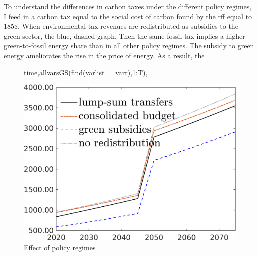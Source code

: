 To understand the differences in carbon taxes under the different policy regimes, I feed in a carbon tax equal to the social cost of carbon found by the rff equal to 185\$. When environmental tax revenues are redistributed as subsidies to the green sector, the blue, dashed graph. Then the same fossil tax implies a higher green-to-fossil energy share than in all other policy regimes. The subsidy to green energy ameliorates the rise in the price of energy. As a result, the 


\begin{figure}[h!!]time,allvarsGS(find(varlist==varr),1:T),
	\centering
	\caption{Effect of policy regimes}\label{fig:CompRegimes}
	
	\begin{minipage}[]{0.32\textwidth}
		\includegraphics[width=1\textwidth]{../../codding_model/own_basedOnFried/optimalPol_010922_revision/figures/all_5Sept22/TAUFCO2_TaulCalib_spillover0_nsk0_xgr0_sep1_LFlimit1_emsbase0_countec0_GovRev1_etaa0.79_lgd1.png}
	\end{minipage}
\begin{minipage}[]{0.32\textwidth}

\end{minipage}
\end{figure}
